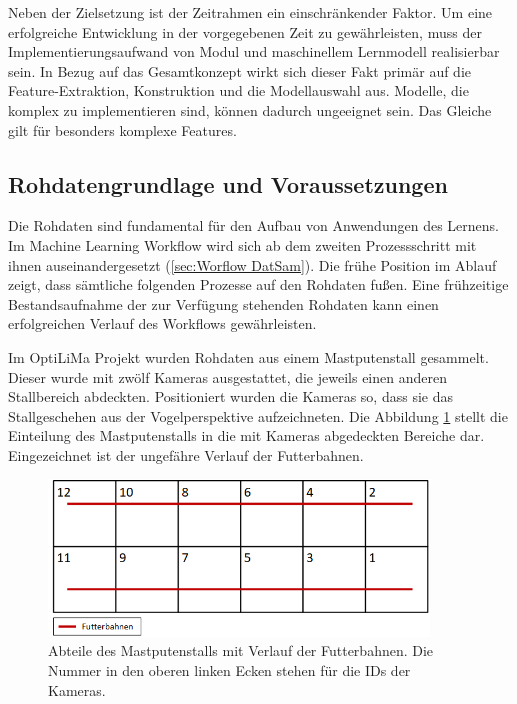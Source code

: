  Neben der Zielsetzung ist der Zeitrahmen ein einschränkender Faktor. Um eine erfolgreiche Entwicklung in der vorgegebenen Zeit zu gewährleisten, muss der Implementierungsaufwand von Modul und maschinellem Lernmodell realisierbar sein. In Bezug auf das Gesamtkonzept wirkt sich dieser Fakt primär auf die Feature-Extraktion, Konstruktion und die Modellauswahl aus. Modelle, die komplex zu implementieren sind, können dadurch ungeeignet sein. Das Gleiche gilt für besonders komplexe Features.



\subsection{Rohdatengrundlage und Voraussetzungen} \label{sec:Meth RohDat}
Die Rohdaten sind fundamental für den Aufbau von Anwendungen des  Lernens. Im \gls{Machine Learning Workflow} wird sich ab dem zweiten Prozessschritt mit ihnen auseinandergesetzt (\autoref{sec:Worflow DatSam}). Die frühe Position im Ablauf zeigt, dass sämtliche folgenden Prozesse auf den Rohdaten fußen. Eine frühzeitige Bestandsaufnahme der zur Verfügung stehenden Rohdaten kann einen erfolgreichen Verlauf des Workflows gewährleisten. \par

Im \acrshort{OptiLiMa} Projekt wurden Rohdaten aus einem Mastputenstall gesammelt. Dieser wurde mit zwölf Kameras ausgestattet, die jeweils einen anderen Stallbereich abdeckten. Positioniert wurden die Kameras so, dass sie das Stallgeschehen aus der Vogelperspektive aufzeichneten. Die Abbildung \ref{fig:KamerasImStall} stellt die Einteilung des Mastputenstalls in die mit Kameras abgedeckten Bereiche dar. Eingezeichnet ist der ungefähre Verlauf der Futterbahnen.

\begin{figure}[htb]
    \centering
    \includegraphics[width=0.9\textwidth]{img/Grafiken/Stallbereiche mit Futterbahn.png}
    \caption[Abteile des Mastputenstalls mit Verlauf der Futterbahnen.]{Abteile des Mastputenstalls mit Verlauf der Futterbahnen. Die Nummer in den oberen linken Ecken stehen für die IDs der Kameras.}
    \label{fig:KamerasImStall}
\end{figure}

